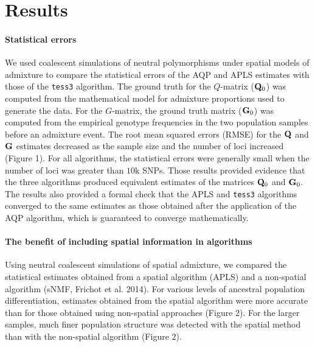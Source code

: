 \clearpage
\newpage


\section{Results}
\paragraph{Statistical errors}  We used  coalescent simulations of neutral polymorphisms under spatial models of admixture to compare the statistical errors of the AQP and APLS estimates with those of the {\tt tess3} algorithm. The ground truth for the $Q$-matrix (${\bf Q}_0$)  was computed from the mathematical model for admixture proportions used to generate the data. For the $G$-matrix, the  ground truth matrix (${\bf G}_0$) was computed from the empirical genotype frequencies in the two population samples before an admixture event.  The root mean squared errors (RMSE) for the ${\bf Q}$ and ${\bf G}$ estimates decreased as the sample size and the number of loci increased (Figure 1). For all algorithms, the statistical errors were generally small when the number of loci was greater than $10$k SNPs. Those results provided evidence that the three algorithms produced equivalent estimates of the matrices ${\bf Q}_0$ and ${\bf G}_0$. The results also provided a formal check that the APLS and {\tt tess3} algorithms converged to the same estimates as those obtained after the application of  the AQP algorithm, which is guaranteed to converge mathematically.   


\paragraph{The benefit of including spatial information in algorithms}    Using  neutral coalescent simulations of spatial admixture, we compared the statistical estimates obtained from a spatial algorithm (APLS) and a non-spatial algorithm (sNMF, Frichot et al. 2014).  For various levels of ancestral population differentiation, estimates obtained from the spatial algorithm were more accurate than for those obtained using non-spatial approaches (Figure 2). For the larger samples, much finer population structure was detected with the spatial method than with the non-spatial algorithm (Figure 2). 

